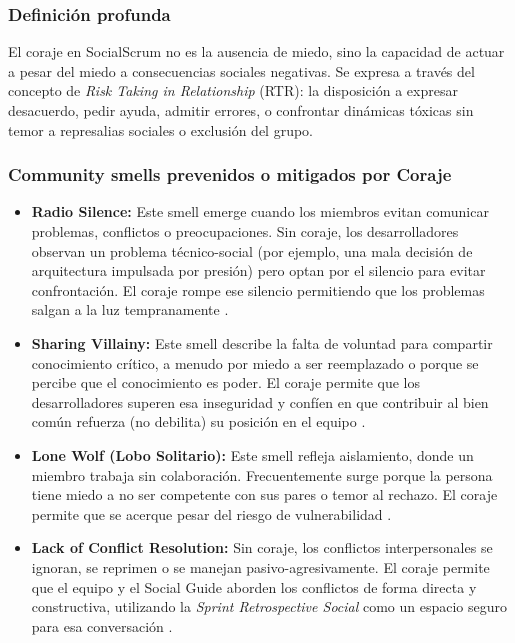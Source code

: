\subsubsection*{Definición profunda}

El coraje en SocialScrum no es la ausencia de miedo, sino la capacidad de actuar a pesar del miedo a consecuencias sociales negativas. Se expresa a través del concepto de \textit{Risk Taking in Relationship} (RTR): la disposición a expresar desacuerdo, pedir ayuda, admitir errores, o confrontar dinámicas tóxicas sin temor a represalias sociales o exclusión del grupo.

\subsubsection*{Community smells prevenidos o mitigados por Coraje}

\begin{itemize}

\item \textbf{Radio Silence:} Este smell emerge cuando los miembros evitan comunicar problemas, conflictos o preocupaciones. Sin coraje, los desarrolladores observan un problema técnico-social (por ejemplo, una mala decisión de arquitectura impulsada por presión) pero optan por el silencio para evitar confrontación. El coraje rompe ese silencio permitiendo que los problemas salgan a la luz tempranamente \cite{saeeda2024nontechnicaldebt}.

\item \textbf{Sharing Villainy:} Este smell describe la falta de voluntad para compartir conocimiento crítico, a menudo por miedo a ser reemplazado o porque se percibe que el conocimiento es poder. El coraje permite que los desarrolladores superen esa inseguridad y confíen en que contribuir al bien común refuerza (no debilita) su posición en el equipo \cite{caballero2022communitysmells}.

\item \textbf{Lone Wolf (Lobo Solitario):} Este smell refleja aislamiento, donde un miembro trabaja sin colaboración. Frecuentemente surge porque la persona tiene miedo a no ser competente con sus pares o temor al rechazo. El coraje permite que se acerque pesar del riesgo de vulnerabilidad \cite{caballero2022communitysmells}.

\item \textbf{Lack of Conflict Resolution:} Sin coraje, los conflictos interpersonales se ignoran, se reprimen o se manejan pasivo-agresivamente. El coraje permite que el equipo y el Social Guide aborden los conflictos de forma directa y constructiva, utilizando la \textit{Sprint Retrospective Social} como un espacio seguro para esa conversación \cite{saeeda2024nontechnicaldebt}.

\end{itemize}

